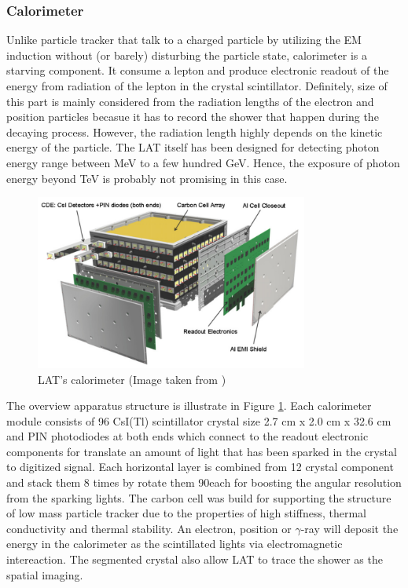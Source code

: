 \subsubsection{Calorimeter}
Unlike particle tracker that talk to a charged particle by utilizing
the EM induction without (or barely) disturbing the particle state,
calorimeter is a starving component. It consume a lepton and produce 
electronic readout of the energy from radiation of the lepton in the
crystal scintillator. Definitely, size of this part is mainly considered 
from the radiation lengths of the electron and position particles becasue it 
has to record the shower that happen during the decaying process.
However, the radiation length highly depends on the kinetic energy 
of the particle. The LAT itself has been designed for detecting photon 
energy range between MeV to a few hundred GeV. Hence, the exposure of 
photon energy beyond TeV is probably not promising in this case.


\begin{figure}[h!]
    \centering
    \includegraphics[width=0.8\textwidth]{content/background/figures/fermi_calorimeter.png}
    \caption{LAT's calorimeter (Image taken from \cite{FermiLAT})}
    \label{fig:fermi_calorimeter}
\end{figure}

The overview apparatus structure is illustrate in Figure \ref{fig:fermi_calorimeter}.
Each calorimeter module consists of 96 CsI(Tl) scintillator crystal size 
2.7 cm x 2.0 cm x 32.6 cm and PIN photodiodes at both ends which connect 
to the readout electronic components for translate an amount of light 
that has been sparked in the crystal to digitized signal. Each horizontal 
layer is combined from 12 crystal component and stack them 8 times by 
rotate them 90\textdegree each for boosting the angular resolution 
from the sparking lights. The carbon cell was build for supporting 
the structure of low mass particle tracker due to the properties of 
high stiffness, thermal conductivity and thermal stability.
An electron, position or $\gamma$-ray will deposit the energy in the
calorimeter as the scintillated lights via electromagnetic intereaction.
The segmented crystal also allow LAT to trace the shower
as the spatial imaging.


